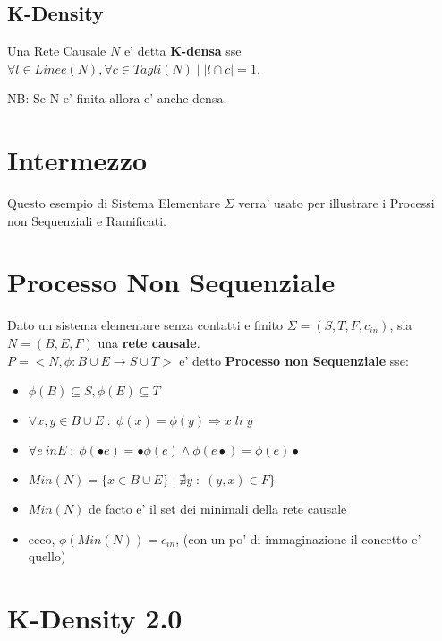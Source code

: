 \subsection{K-Density}

Una Rete Causale $N$ e' detta \textbf{K-densa} sse $\forall l \in Linee(N), \forall c \in Tagli(N) \; | \; |l \cap c| = 1$.

NB: Se N e' finita allora e' anche densa.

\section{Intermezzo}

Questo esempio di Sistema Elementare $\Sigma$ verra' usato per illustrare i Processi non Sequenziali e Ramificati.


\section{Processo Non Sequenziale}

Dato un sistema elementare senza contatti e finito $\Sigma = (S, T, F, c_{in})$, sia $N = (B, E, F)$ una \textbf{rete causale}. \\

$P = <N, \phi : B \cup E \rightarrow S \cup T>$ e' detto \textbf{Processo non Sequenziale} sse:

\begin{itemize}
    \item $\phi(B) \subseteq S, \phi(E) \subseteq T$
    \item $\forall x,y \in B \cup E \; : \; \phi(x) = \phi(y) \Rightarrow x \; li \; y$
    \item $\forall e \ in E \; : \; \phi(\bullet e) = \bullet \phi(e) \land  \phi(e \bullet) = \phi(e) \bullet$
    \item $Min(N) = \{ x \in B \cup E \} \; | \; \nexists y \; : \; (y, x) \in F \}$
    \item $Min(N)$ de facto e' il set dei minimali della rete causale
    \item ecco, $\phi(Min(N)) = c_{in}$, (con un po' di immaginazione il concetto e' quello)
\end{itemize}


\section{K-Density 2.0}


